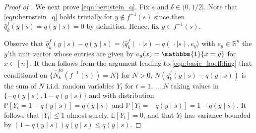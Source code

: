 \documentclass[11pt]{article}
\newcommand{\mbbP}{\mathbb{P}}
\newcommand{\mbbE}{\mathbb{E}}
\newcommand{\mbbR}{\mathbb{R}}
\theoremstyle{definition}
\theoremstyle{definition}
\begin{document}
\begin{proof}[Proof of ]
	We next prove \eqref{eqn:bernstein_q}.
	Fix $s$ and $\delta \in(0,1/2]$.
	Note that \eqref{eqn:bernstein_q} holds trivially for $y\notin f^{-1}(s)$ since then $\hat{q}_k^f(y\mid s) = q(y\mid s) = 0$ by definition.
	Hence, fix $y\in f^{-1}(s)$.

	Observe that $\hat{q}_k^f(y\mid s)-q(y\mid s)=\langle\hat{q}_k^f(\,\cdot \mid s)-q(\,\cdot \mid s),e_y\rangle$ with $e_y\in\mbbR^n$ the $y$'th unit vector whose entries are given by $e_y(x)=\mathbbm{1}\{x=y\}$ for $x\in[n]$.
	It then follows from the argument leading to \eqref{eqn:basic_hoeffding} that conditional on $\{\hat{N}^{\mathrm{to}}_k(f^{-1}(s))=N\}$ for $N>0$, $N(\hat{q}^f_k(y\mid s)-q(y\mid s))$ is the sum of $N$ i.i.d. random variables $Y_t$ for $t=1,\ldots,N$ taking values in $\{-q(y\mid s),1-q(y\mid s)\}$ and with distribution $\mbbP[Y_t=1-q(y\mid s)]=q(y\mid s)$ and $\mbbP[Y_t = -q(y\mid s)]=1-q(y\mid s)$.
	It follows that $|Y_t|\leq 1$ almost surely, $\mbbE[Y_t]=0$, and that $Y_t$ has variance bounded by $(1-q(y\mid s))q(y\mid s)\leq q(y\mid s)$.


\end{proof}
\end{document}
